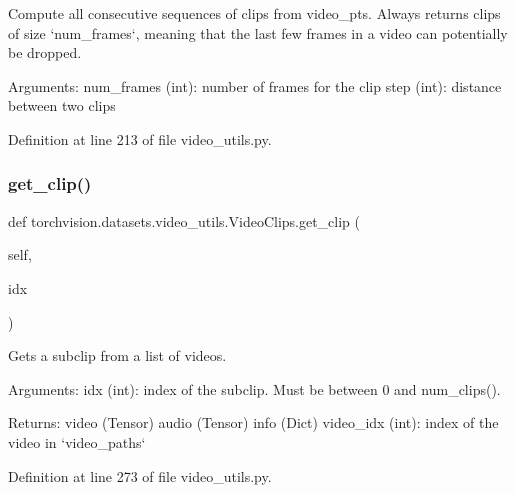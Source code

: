 \begin{DoxyVerb}Compute all consecutive sequences of clips from video_pts.
Always returns clips of size `num_frames`, meaning that the
last few frames in a video can potentially be dropped.

Arguments:
    num_frames (int): number of frames for the clip
    step (int): distance between two clips
\end{DoxyVerb}
 

Definition at line 213 of file video\+\_\+utils.\+py.

\mbox{\label{classtorchvision_1_1datasets_1_1video__utils_1_1VideoClips_a1596126a829498b852406c593268568e}} 
\subsubsection{\texorpdfstring{get\+\_\+clip()}{get\_clip()}}
{\footnotesize\ttfamily def torchvision.\+datasets.\+video\+\_\+utils.\+Video\+Clips.\+get\+\_\+clip (\begin{DoxyParamCaption}\item[{}]{self,  }\item[{}]{idx }\end{DoxyParamCaption})}

\begin{DoxyVerb}Gets a subclip from a list of videos.

Arguments:
    idx (int): index of the subclip. Must be between 0 and num_clips().

Returns:
    video (Tensor)
    audio (Tensor)
    info (Dict)
    video_idx (int): index of the video in `video_paths`
\end{DoxyVerb}
 

Definition at line 273 of file video\+\_\+utils.\+py.

\mbox{\label{classtorchvision_1_1datasets_1_1video__utils_1_1VideoClips_a52b367dc6680de516b0e1940c422d5db}} 
